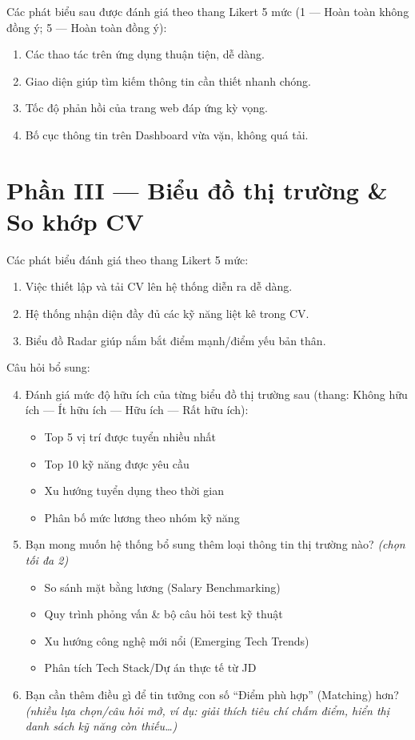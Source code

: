 \noindent Các phát biểu sau được đánh giá theo thang Likert 5 mức (1 --- Hoàn toàn không đồng ý; 5 --- Hoàn toàn đồng ý):

\begin{enumerate}
    \item Các thao tác trên ứng dụng thuận tiện, dễ dàng.
    \item Giao diện giúp tìm kiếm thông tin cần thiết nhanh chóng.
    \item Tốc độ phản hồi của trang web đáp ứng kỳ vọng.
    \item Bố cục thông tin trên Dashboard vừa vặn, không quá tải.
\end{enumerate}

\section*{Phần III --- Biểu đồ thị trường \& So khớp CV}

\noindent Các phát biểu đánh giá theo thang Likert 5 mức:

\begin{enumerate}
    \item Việc thiết lập và tải CV lên hệ thống diễn ra dễ dàng.
    \item Hệ thống nhận diện đầy đủ các kỹ năng liệt kê trong CV.
    \item Biểu đồ Radar giúp nắm bắt điểm mạnh/điểm yếu bản thân.
\end{enumerate}

\noindent Câu hỏi bổ sung:

\begin{enumerate}
    \setcounter{enumi}{3}
    \item Đánh giá mức độ hữu ích của từng biểu đồ thị trường sau (thang: Không hữu ích --- Ít hữu ích --- Hữu ích --- Rất hữu ích):
    \begin{itemize}
        \item Top 5 vị trí được tuyển nhiều nhất
        \item Top 10 kỹ năng được yêu cầu
        \item Xu hướng tuyển dụng theo thời gian
        \item Phân bố mức lương theo nhóm kỹ năng
    \end{itemize}
    \item Bạn mong muốn hệ thống bổ sung thêm loại thông tin thị trường nào? \textit{(chọn tối đa 2)}
    \begin{itemize}
        \item So sánh mặt bằng lương (Salary Benchmarking)
        \item Quy trình phỏng vấn \& bộ câu hỏi test kỹ thuật
        \item Xu hướng công nghệ mới nổi (Emerging Tech Trends)
        \item Phân tích Tech Stack/Dự án thực tế từ JD
    \end{itemize}
    \item Bạn cần thêm điều gì để tin tưởng con số ``Điểm phù hợp'' (Matching) hơn? \textit{(nhiều lựa chọn/câu hỏi mở, ví dụ: giải thích tiêu chí chấm điểm, hiển thị danh sách kỹ năng còn thiếu\ldots)}
\end{enumerate}

